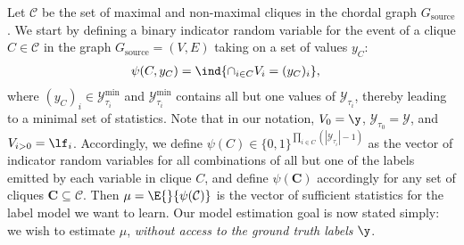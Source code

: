 \documentclass[letterpaper]{article}
\begin{document}
\begin{appendix}
Let $\mathcal{C}$ be the set of maximal and non-maximal cliques in the chordal graph $G_{\text{source}}$.
We start by defining a binary indicator random variable for the event of a clique $C \in \mathcal{C}$ in the graph $G_{\text{source}} = (V, E)$ taking on a set of values $y_C$:
\begin{align*}
	\psi(C,y_C)
	&=
	\ind{ \cap_{i \in C} V_i = (y_C)_i },
\end{align*}
where $(y_C)_i \in \mathcal{Y}_{\tau_i}^{\text{min}}$ and $\mathcal{Y}_{\tau_i}^{\text{min}}$ contains all but one values of $\mathcal{Y}_{\tau_i}$, thereby leading to a minimal set of statistics.
Note that in our notation, $V_0 = \y$, $\mathcal{Y}_{\tau_0} = \mathcal{Y}$, and $V_{i > 0} = \lf_i$.
Accordingly, we define $\psi(C) \in \{0,1\}^{\prod_{i\in C} (|\mathcal{Y}_{\tau_i}|-1)}$ as the vector of indicator random variables for all combinations of all but one of the labels emitted by each variable in clique $C$, and define $\psi(\textbf{C})$ accordingly for any set of cliques $\textbf{C} \subseteq \mathcal{C}$.
Then $\mu = \E{}{ \psi(\mathcal{C}) }$ is the vector of sufficient statistics for the label model we want to learn.
Our model estimation goal is now stated simply: we wish to estimate $\mu$, \textit{without access to the ground truth labels} $\y$.


\end{appendix}
\end{document}
